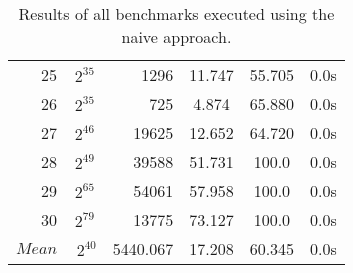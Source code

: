 \begin{table}[b!]
\begin{tabular}{rSrSSS}
    25 & {$2^{35}$} & 1296 & 11.747 & 55.705 & 0.0s \\
    26 & {$2^{35}$} & 725 & 4.874 & 65.880 & 0.0s \\
    27 & {$2^{46}$} & 19625 & 12.652 & 64.720 & 0.0s \\
    28 & {$2^{49}$} & 39588 & 51.731 & 100.0 & 0.0s \\
    29 & {$2^{65}$} & 54061 & 57.958 & 100.0 & 0.0s \\
    30 & {$2^{79}$} & 13775 & 73.127 & 100.0 & 0.0s \\	\midrule
	{$Mean$} & {$~2^{40}$} & 5440.067 & 17.208 & 60.345 & 0.0s \\	\bottomrule
\end{tabular}
\caption{Results of all benchmarks executed using the naive approach.}
\label{tab:resultsnaive}
\end{table}

